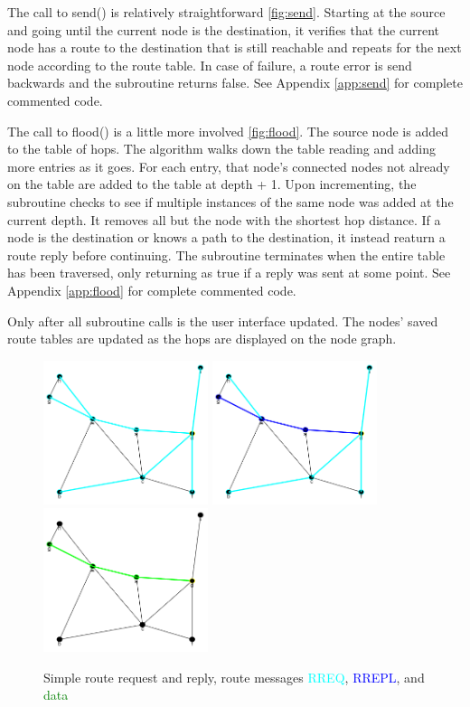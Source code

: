 \documentclass[conference]{IEEEtran}
\begin{document}
The call to send() is relatively straightforward \ref{fig:send}. Starting at the source and going until the current node is the destination, it verifies that the current node has a route to the destination that is still reachable and repeats for the next node according to the route table. In case of failure, a route error is send backwards and the subroutine returns false. See Appendix \ref{app:send} for complete commented code.

The call to flood() is a little more involved \ref{fig:flood}. The source node is added to the table of hops. The algorithm walks down the table reading and adding more entries as it goes. For each entry, that node's connected nodes not already on the table are added to the table at depth + 1. Upon incrementing, the subroutine checks to see if multiple instances of the same node was added at the current depth. It removes all but the node with the shortest hop distance. If a node is the destination or knows a path to the destination, it instead reaturn a route reply before continuing. The subroutine terminates when the entire table has been traversed, only returning as true if a reply was sent at some point. See Appendix \ref{app:flood} for complete commented code.

Only after all subroutine calls is the user interface updated. The nodes' saved route tables are updated as the hops are displayed on the node graph. 

\begin{figure}
	\centering
	\includegraphics[width=1.9in]{Ex_1_request.png}
	\includegraphics[width=1.9in]{Ex_1_reply.png}
	\includegraphics[width=1.9in]{Ex_1_data.png}
	\caption{Simple route request and reply, route messages \protect\textcolor{cyan}{RREQ}, \protect\textcolor{blue}{RREPL}, and \protect\textcolor{green}{data} }
	\label{fig:ex_1}
\end{figure}
\end{document}
